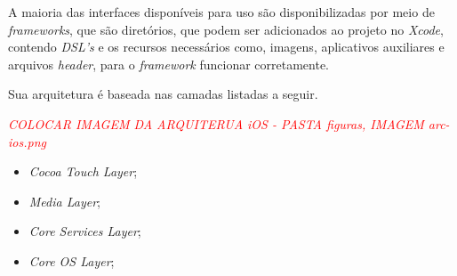 A maioria das interfaces disponíveis para uso são disponibilizadas por meio de \textit{frameworks}, 
que são diretórios, que podem ser adicionados ao projeto no \textit{Xcode}, contendo \textit{DSL's} e os recursos necessários como, 
imagens, aplicativos auxiliares e arquivos \textit{header}, para o \textit{framework} funcionar corretamente.

Sua arquitetura é baseada nas camadas listadas a seguir.%
 
\textit{\textcolor{red}{COLOCAR IMAGEM DA ARQUITERUA iOS - PASTA figuras, IMAGEM arc-ios.png}}

\begin{itemize}

	\item \textit{Cocoa Touch Layer};
	\item \textit{Media Layer};
	\item \textit{Core Services Layer};
	\item \textit{Core OS Layer};

\end{itemize}

